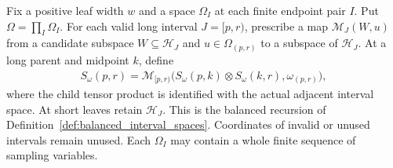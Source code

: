\begin{definition}
    \label{def:independent_interval_operation}
    \leanok
    Fix a positive leaf width $w$ and a space $\Omega_I$ at each finite
    endpoint pair $I$. Put $\Omega=\prod_I\Omega_I$. For each valid long
    interval $J=[p,r)$, prescribe a map $\mathcal M_J(W,u)$ from a candidate
    subspace $W\subseteq\mathcal H_J$ and $u\in\Omega_{(p,r)}$ to a subspace
    of $\mathcal H_J$. At a long parent and midpoint $k$, define
    \begin{align}
        S_\omega(p,r)=\mathcal M_{[p,r)}
        \bigl(S_\omega(p,k)\otimes S_\omega(k,r),\omega_{(p,r)}\bigr),
        \label{eq:independent_interval_parent}
    \end{align}
    where the child tensor product is identified with the actual adjacent
    interval space. At short leaves retain $\mathcal H_J$. This is the
    balanced recursion of Definition~\ref{def:balanced_interval_spaces}.
    Coordinates of invalid or unused intervals remain unused. Each
    $\Omega_I$ may contain a whole finite sequence of sampling variables.
\end{definition}

